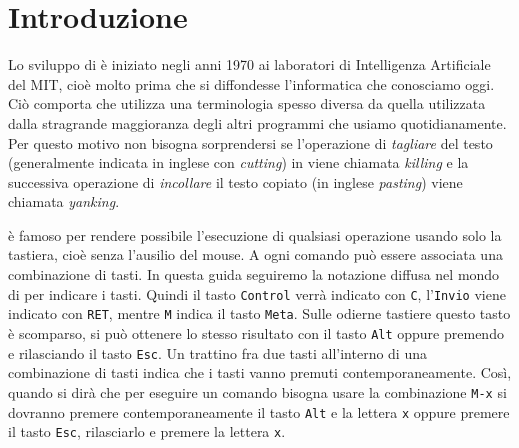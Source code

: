 \documentclass[11pt,a4paper]{article}
\title{\titolo}
\author{\autorea \and \autoreb \and \autorec}
\date{\today}
\begin{document}
\maketitle
\begin{abstract}
  \noindent In questo articolo vengono brevemente presentati il
  programma \emacs{} ed il pacchetto \auctex{} per le principali
  piattaforme: Windows, GNU/Linux e Mac OS. Dopo una introduzione ai
  programmi, verranno esposte le modalità per poter installare e
  configurare \emacs{} e \auctex{} per poter scrivere documenti
  \LaTeX{}. L'articolo non ha la pretesa di essere un \emph{manuale},
  bensì un piccolo tutorial per far avvicinare gli utenti di \LaTeX{}
  a questo programma, non così troppo complicato come spesso viene
  indicato.
\end{abstract}

\begin{multicols}{2}
  \tableofcontents
\end{multicols}

\section{Introduzione}
\label{sec:intro}

\textcolor{red}{\lipsum[1]}

Lo sviluppo di \emacs{} è iniziato negli anni 1970 ai laboratori di Intelligenza
Artificiale del MIT, cioè molto prima che si diffondesse l'informatica che
conosciamo oggi.  Ciò comporta che \emacs{} utilizza una terminologia spesso
diversa da quella utilizzata dalla stragrande maggioranza degli altri programmi
che usiamo quotidianamente.  Per questo motivo non bisogna sorprendersi se
l'operazione di \emph{tagliare} del testo (generalmente indicata in inglese con
\emph{cutting}) in \emacs{} viene chiamata \emph{killing} e la successiva
operazione di \emph{incollare} il testo copiato (in inglese \emph{pasting})
viene chiamata \emph{yanking}.

\emacs{} è famoso per rendere possibile l'esecuzione di qualsiasi operazione
usando solo la tastiera, cioè senza l'ausilio del mouse.  A ogni comando può
essere associata una combinazione di tasti.  In questa guida seguiremo la
notazione diffusa nel mondo di \emacs{} per indicare i tasti.  Quindi il tasto
\verb!Control! verrà indicato con \verb!C!, l'\verb!Invio! viene indicato con
\verb!RET!, mentre \verb!M! indica il tasto \verb!Meta!.  Sulle odierne tastiere
questo tasto è scomparso, si può ottenere lo stesso risultato con il tasto
\verb!Alt! oppure premendo e rilasciando il tasto \verb!Esc!.  Un trattino fra
due tasti all'interno di una combinazione di tasti indica che i tasti vanno
premuti contemporaneamente.  Così, quando si dirà che per eseguire un comando
bisogna usare la combinazione \verb!M-x! si dovranno premere contemporaneamente
il tasto \verb!Alt! e la lettera \verb!x! oppure premere il tasto \verb!Esc!,
rilasciarlo e premere la lettera \verb!x!.
\end{document}
